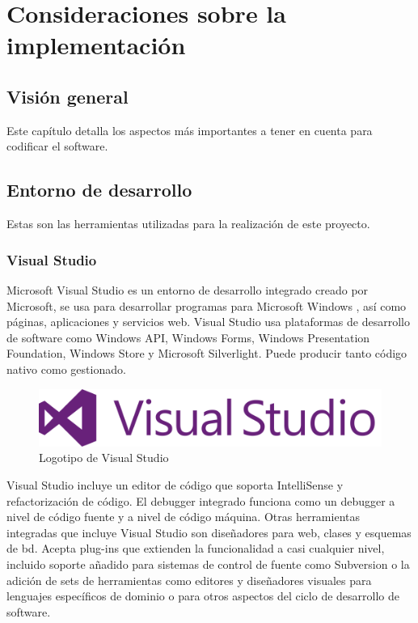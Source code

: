 \chapter{Consideraciones sobre la implementación}

\section{Visión general}

Este capítulo detalla los aspectos más importantes a tener en cuenta para codificar el software.

\section{Entorno de desarrollo}

Estas son las herramientas utilizadas para la realización de este proyecto.

\subsection{Visual Studio}

Microsoft Visual Studio\cite{VisualStudio} es un entorno de desarrollo integrado creado por Microsoft, se usa para desarrollar programas para Microsoft Windows , así como páginas, aplicaciones y servicios web. Visual Studio usa plataformas de desarrollo de software como Windows API, Windows Forms, Windows Presentation Foundation, Windows Store y Microsoft Silverlight. Puede producir tanto código nativo como gestionado.

\begin{figure}[!htp]
	 \centering
	 \includegraphics[scale=1.0]{fig/visualstudio_logo}
	 \caption{Logotipo de Visual Studio}
\end{figure}

Visual Studio incluye un editor de código que soporta IntelliSense y refactorización de código. El debugger integrado funciona como un debugger a nivel de código fuente y a nivel de código máquina. Otras herramientas integradas que incluye Visual Studio son diseñadores para web, clases y esquemas de \acrshort{bd}. Acepta plug-ins que extienden la funcionalidad a casi cualquier nivel, incluido soporte añadido para sistemas de control de fuente como Subversion o la adición de sets de herramientas como editores y diseñadores visuales para lenguajes específicos de dominio o para otros aspectos del ciclo de desarrollo de software.

